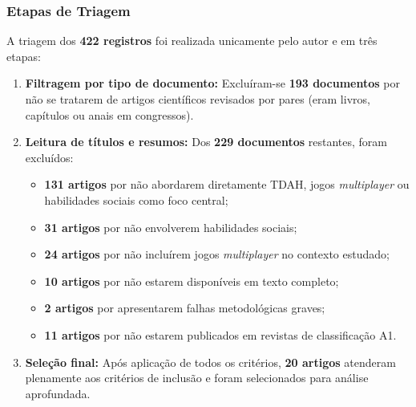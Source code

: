 \subsubsection{Etapas de Triagem}

A triagem dos \textbf{422 registros} foi realizada unicamente pelo autor e em três etapas:

\begin{enumerate}
    \item \textbf{Filtragem por tipo de documento:} Excluíram-se \textbf{193 documentos} por não se tratarem de artigos científicos revisados por pares (eram livros, capítulos ou anais em congressos).

    \item \textbf{Leitura de títulos e resumos:} Dos \textbf{229 documentos} restantes, foram excluídos:
    \begin{itemize}
        \item \textbf{131 artigos} por não abordarem diretamente TDAH, jogos \textit{multiplayer} ou habilidades sociais como foco central;
        \item \textbf{31 artigos} por não envolverem habilidades sociais;
        \item \textbf{24 artigos} por não incluírem jogos \textit{multiplayer} no contexto estudado;
        \item \textbf{10 artigos} por não estarem disponíveis em texto completo;
        \item \textbf{2 artigos} por apresentarem falhas metodológicas graves;
        \item \textbf{11 artigos} por não estarem publicados em revistas de classificação A1.
    \end{itemize}

    \item \textbf{Seleção final:} Após aplicação de todos os critérios, \textbf{20 artigos} atenderam plenamente aos critérios de inclusão e foram selecionados para análise aprofundada.
\end{enumerate}

